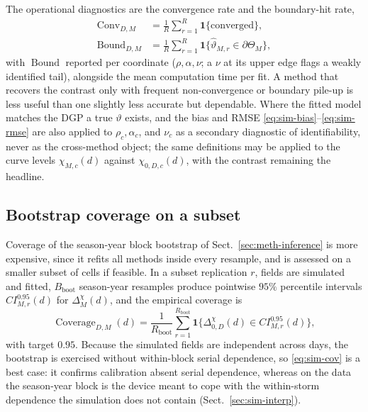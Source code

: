 The operational diagnostics are the convergence rate and the boundary-hit rate,
\begin{align}
  \operatorname{Conv}_{D,M}
   & =\frac1R\sum_{r=1}^R\mathbf 1\{\text{converged}\},
  \label{eq:sim-conv}                                                                       \\
  \operatorname{Bound}_{D,M}
   & =\frac1R\sum_{r=1}^R\mathbf 1\bigl\{\widehat\vartheta_{M,r}\in\partial\Theta_M\bigr\},
  \label{eq:sim-bound}
\end{align}
with \(\operatorname{Bound}\) reported per coordinate (\(\rho,\alpha,\nu\); a \(\nu\) at its upper edge flags a weakly identified tail), alongside the mean computation time per fit. A method that recovers the contrast only with frequent non-convergence or boundary pile-up is less useful than one slightly less accurate but dependable. Where the fitted model matches the DGP a true \(\vartheta\) exists, and the bias and RMSE \eqref{eq:sim-bias}--\eqref{eq:sim-rmse} are also applied to \(\rho_c,\alpha_c\), and \(\nu_c\) as a secondary diagnostic of identifiability, never as the cross-method object; the same definitions may be applied to the curve levels \(\chi_{M,c}(d)\) against \(\chi_{0,D,c}(d)\), with the contrast remaining the headline.

\subsection{Bootstrap coverage on a subset}\label{sec:sim-boot}

Coverage of the season-year block bootstrap of Sect.~\ref{sec:meth-inference} is more expensive, since it refits all methods inside every resample, and is assessed on a smaller subset of cells if feasible. In a subset replication \(r\), fields are simulated and fitted, \(B_{\mathrm{boot}}\) season-year resamples produce pointwise \(95\%\) percentile intervals \(CI_{M,r}^{0.95}(d)\) for \(\Delta_M^{\chi}(d)\), and the empirical coverage is
\begin{equation}\label{eq:sim-cov}
  \operatorname{Coverage}_{D,M}(d)
  =\frac1{R_{\mathrm{boot}}}\sum_{r=1}^{R_{\mathrm{boot}}}
  \mathbf 1\bigl\{\Delta_{0,D}^{\chi}(d)\in CI_{M,r}^{0.95}(d)\bigr\},
\end{equation}
with target \(0.95\). Because the simulated fields are independent across days, the bootstrap is exercised without within-block serial dependence, so \eqref{eq:sim-cov} is a best case: it confirms calibration absent serial dependence, whereas on the data the season-year block is the device meant to cope with the within-storm dependence the simulation does not contain (Sect.~\ref{sec:sim-interp}).

